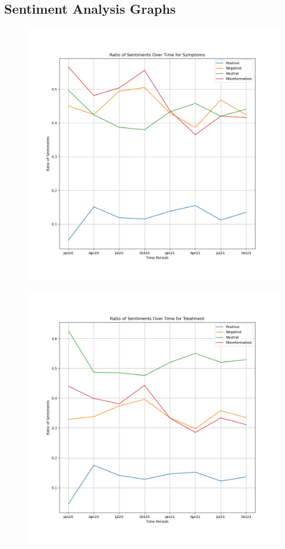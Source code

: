 \documentclass{l4proj}
\begin{document}
\begin{appendices}

\chapter{Sentiment Analysis Graphs}

\begin{figure}[H]
\begin{minipage}[c]{0.49\linewidth}
\centering
\includegraphics[width=\textwidth]{images/SymptomsSentiment.png}
\label{fig:sympsen}
\end{minipage}\hfill
\begin{minipage}[c]{0.49\linewidth}
\centering
\includegraphics[width=\textwidth]{images/TreatmentSentiment.png}

\end{minipage}
\end{figure}
\end{appendices}
\end{document}
